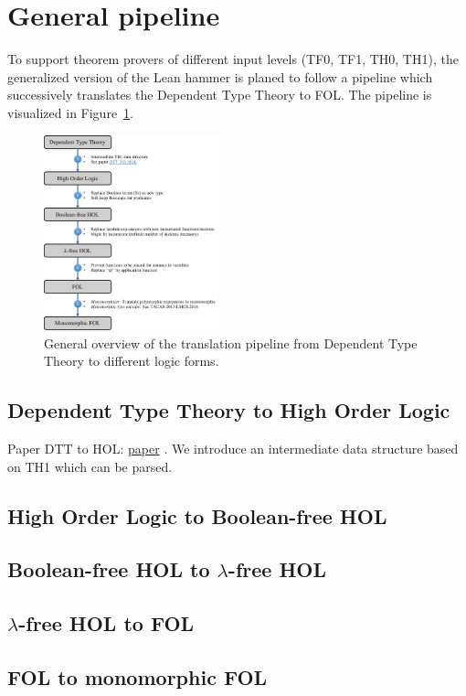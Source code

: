 \documentclass[a4paper]{article}
\begin{document}
\section{General pipeline}
To support theorem provers of different input levels (TF0, TF1, TH0, TH1), the generalized version of the Lean hammer is planed to follow a pipeline which successively translates the Dependent Type Theory to FOL. The pipeline is visualized in Figure~\ref{fig:pipeline}.
\begin{figure}[ht!]
	\centering
	\includegraphics[width=0.45\textwidth]{figures/pipeline_DTT_HOL.pdf}
	\caption{General overview of the translation pipeline from Dependent Type Theory to different logic forms.}
	\label{fig:pipeline}
\end{figure}
\subsection{Dependent Type Theory to High Order Logic}
Paper DTT to HOL: \href{https://link.springer.com/chapter/10.1007/BFb0037108}{paper} \cite{DTT2HOL}. We introduce an intermediate data structure based on TH1 which can be parsed. 
\subsection{High Order Logic to Boolean-free HOL}
\subsection{Boolean-free HOL to $\lambda$-free HOL}
\subsection{$\lambda$-free HOL to FOL}
\subsection{FOL to monomorphic FOL}
\end{document}
